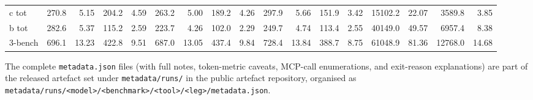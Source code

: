 \begin{table}[h]
\begin{tabular}{ll rr rr rr rr rr rr rr rr}
\multicolumn{2}{l}{c tot}    & 270.8 & 5.15  & 204.2 & 4.59 & 263.2 & 5.00 & 189.2 & 4.26 & 297.9 & 5.66 & 151.9 & 3.42 & 15102.2 & 22.07 & 3589.8 & 3.85 \\
\multicolumn{2}{l}{b tot}    & 282.6 & 5.37  & 115.2 & 2.59 & 223.7 & 4.26 & 102.0 & 2.29 & 249.7 & 4.74 & 113.4 & 2.55 & 40149.0 & 49.57 & 6957.4 & 8.38 \\
\multicolumn{2}{l}{3-bench}  & 696.1 & 13.23 & 422.8 & 9.51 & 687.0 & 13.05 & 437.4 & 9.84 & 728.4 & 13.84 & 388.7 & 8.75 & 61048.9 & 81.36 & 12768.0 & 14.68 \\
\bottomrule
\end{tabular}
\end{table}

The complete \texttt{metadata.json} files (with full notes,
token-metric caveats, MCP-call enumerations, and exit-reason
explanations) are part of the released artefact set under
\texttt{metadata/runs/} in the public artefact repository, organised as
\texttt{metadata/runs/<model>/<benchmark>/<tool>/<leg>/metadata.json}.

\FloatBarrier
